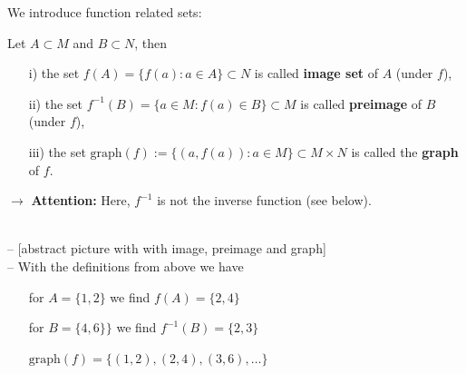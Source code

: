 \begin{frame}
	We introduce function related sets: \vspace{-0.3cm}
	\begin{defi}\label{def:image_preimage_graph}
		Let $A \subset M$ and $B \subset N$, then
		\begin{itemize} \color{defgruen}
			\item[i)] the set $f(A) = \{f(a) : a\in A\} \subset N$ is called \textbf{image set} of $A$ (under $f$),
			\item[ii)] the set $f^{-1}(B)=\lbrace a\in M: f(a)\in B\rbrace \subset M$ is called \textbf{preimage} of $B$ (under $f$),
			\item[iii)] the set $\text{graph}(f) := \{(a,f(a))\colon a \in M\} \subset M\times N$ is called the \textbf{graph} of $f$.
		\end{itemize} 
	\end{defi}
	$\rightarrow$ \textbf{Attention:} Here, $f^{-1}$ is not the inverse function (see below).\\ \vspace{0.2cm}
	~\\
	{\blank
	-- {\small\color{header}[abstract picture with  with image, preimage and graph]}\\
	-- With the definitions from above we have
	\begin{itemize}
		\blank
		\item[] for $A=\{1,2\}$ we find $f(A) = \{2,4\}$
		\item[] for $B=\{4,6\}\}$ we find $f^{-1}(B) = \{2,3\}$
		\item[] $\text{graph}(f) = \{(1,2), (2,4), (3,6), \ldots\}$
	\end{itemize}
}	
\end{frame}


